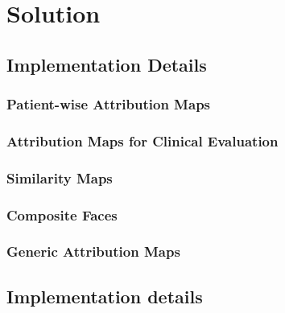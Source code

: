 \documentclass[../report.tex]{subfiles}
\begin{document}
    \chapter{Solution}
    \section{Implementation Details}
    \subsection{Patient-wise Attribution Maps}
    \subsection{Attribution Maps for Clinical Evaluation}
    \subsection{Similarity Maps}
    \subsection{Composite Faces}
    \subsection{Generic Attribution Maps}

    \section{Implementation details}
\end{document}

